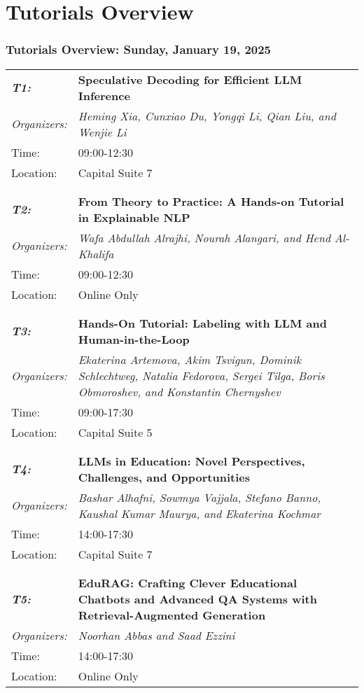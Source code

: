 \chapter{Tutorials Overview}
\subsection{Tutorials Overview: Sunday, January 19, 2025}
\begin{longtable}{p{15mm}p{100mm}}
\emph{\textbf{T1:}} & \textbf{Speculative Decoding for Efficient LLM Inference} \\
\emph{Organizers:} & \emph{Heming Xia, Cunxiao Du, Yongqi Li, Qian Liu, and Wenjie Li} \\
Time: & 09:00-12:30 \\
Location: & Capital Suite 7 \\\\
\hline\\
\emph{\textbf{T2:}} & \textbf{From Theory to Practice: A Hands-on Tutorial in Explainable NLP} \\
\emph{Organizers:} & \emph{Wafa Abdullah Alrajhi, Nourah Alangari, and Hend Al-Khalifa} \\
Time: & 09:00-12:30 \\
Location: & Online Only \\\\
\hline\\
\emph{\textbf{T3:}} & \textbf{Hands-On Tutorial: Labeling with LLM and Human-in-the-Loop} \\
\emph{Organizers:} & \emph{Ekaterina Artemova, Akim Tsvigun, Dominik Schlechtweg, Natalia Fedorova, Sergei Tilga, Boris Obmoroshev, and Konstantin Chernyshev} \\
Time: & 09:00-17:30 \\
Location: & Capital Suite 5 \\\\
\hline\\
\emph{\textbf{T4:}} & \textbf{LLMs in Education: Novel Perspectives, Challenges, and Opportunities} \\
\emph{Organizers:} & \emph{Bashar Alhafni, Sowmya Vajjala, Stefano Banno, Kaushal Kumar Maurya, and Ekaterina Kochmar} \\
Time: & 14:00-17:30 \\
Location: & Capital Suite 7 \\\\
\hline\\
\emph{\textbf{T5:}} & \textbf{EduRAG: Crafting Clever Educational Chatbots and Advanced QA Systems with Retrieval-Augmented Generation} \\
\emph{Organizers:} & \emph{Noorhan Abbas and Saad Ezzini} \\
Time: & 14:00-17:30 \\
Location: & Online Only \\
\end{longtable}

